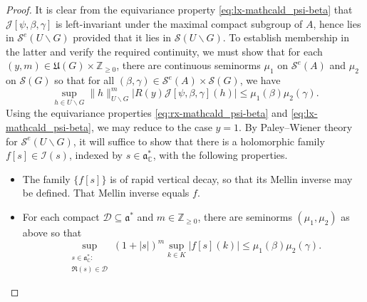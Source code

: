 \documentclass[reqno]{amsart}
\theoremstyle{plain} \newtheorem{theorem} {Theorem}
\theoremstyle{definition} \newtheorem{definition} [theorem] {Definition}
\theoremstyle{itplain} %
\numberwithin{equation}{section}
\numberwithin{theorem}{section}
\renewcommand{\geq}{\geqslant}
\renewcommand{\leq}{\leqslant}
\begin{document}
\begin{proof}
  It is clear from the equivariance property \eqref{eq:lx-mathcald_psi-beta} that $\mathcal{J}[\psi,\beta,\gamma]$ is left-invariant under the maximal compact subgroup of $A$, hence lies in $\mathcal{S}^e(U \backslash G)$ provided that it lies in $\mathcal{S}(U \backslash G)$.  To establish membership in the latter and verify the required continuity, we must show that for each $(y,m) \in \mathfrak{U}(G) \times \mathbb{Z}_{\geq 0}$, there are
continuous seminorms $\mu_1$ on $\mathcal{S}^e(A)$ and $\mu_2$ on $\mathcal{S}(G)$ so that for all $(\beta,\gamma) \in \mathcal{S}^e(A) \times \mathcal{S}(G)$, we have
\begin{equation*}
  \sup_{h \in U \backslash G} \|h\|_{U \backslash G}^m \left\lvert R(y) \mathcal{J}[\psi,\beta,\gamma](h) \right\rvert
  \leq
  \mu_1(\beta) \mu_2(\gamma).
\end{equation*}
Using the equivariance properties \eqref{eq:rx-mathcald_psi-beta} and \eqref{eq:lx-mathcald_psi-beta}, we may reduce to the case $y=1$.  By Paley--Wiener theory for $\mathcal{S}^e(U \backslash G)$, it will suffice to show that there is a holomorphic family $f[s] \in \mathcal{I}(s)$, indexed by $s \in \mathfrak{a}_{\mathbb{C}}^*$, with the following properties.
\begin{itemize}
\item The family $\{f[s]\}$ is of rapid vertical decay, so that its Mellin inverse may be defined.  That Mellin inverse equals $f$.
\item For each compact $\mathcal{D} \subseteq \mathfrak{a}^*$ and $m \in \mathbb{Z}_{\geq 0}$, there are seminorms $(\mu_1,\mu_2)$ as above so that
  \begin{equation}\label{eq:sup_-substack-s-1}
    \sup_{
      \substack{
        s \in \mathfrak{a}_{\mathbb{C}}^* :   \\
         \Re(s) \in \mathcal{D} 
      }
    }
    (1 + |s|)^{m} \sup_{k \in K} |f[s](k)|  \leq \mu_1(\beta) \mu_2(\gamma).
  \end{equation}
\end{itemize}
  

\end{proof}
\end{document}
